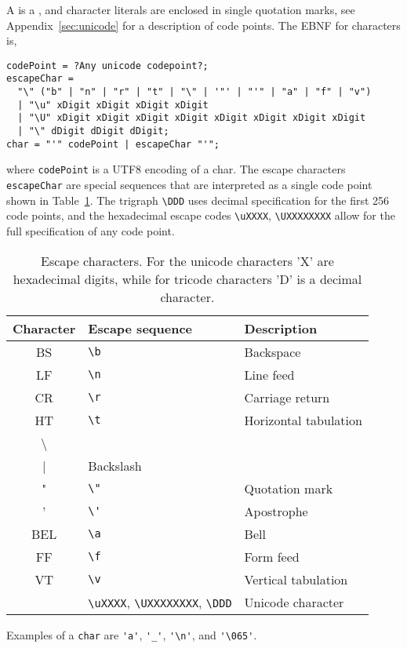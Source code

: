A  is a  , and character literals are enclosed in single quotation marks, see Appendix~\ref{sec:unicode} for a description of code points. The EBNF for characters is,
%
\begin{lstlisting}[language=ebnf]
codePoint = ?Any unicode codepoint?;
escapeChar = 
  "\" ("b" | "n" | "r" | "t" | "\" | '"' | "'" | "a" | "f" | "v")
  | "\u" xDigit xDigit xDigit xDigit
  | "\U" xDigit xDigit xDigit xDigit xDigit xDigit xDigit xDigit
  | "\" dDigit dDigit dDigit;
char = "'" codePoint | escapeChar "'";
\end{lstlisting}
% 
where \lstinline[language=ebnf]!codePoint! is a UTF8 encoding of a char. The escape characters \lstinline[language=ebnf]{escapeChar} are special sequences that are interpreted as a single code point shown in Table~\ref{tab:escapeChar}. The trigraph \lstinline|\DDD| uses decimal specification for the first 256 code points, and the hexadecimal escape codes \lstinline|\uXXXX|, \lstinline|\UXXXXXXXX| allow for the full specification of any code point.
\begin{table}
  \centering
  \begin{tabular}{|c|l|l|}
    \hline
    Character& Escape sequence & Description\\
    \hline
    BS &\lstinline|\b|& Backspace\\
    LF &\lstinline|\n|&Line feed\\
    CR &\lstinline|\r|&Carriage return\\
    HT &\lstinline|\t|&Horizontal tabulation\\
    \textbackslash &\lstinline|\\|&Backslash\\
     " &\lstinline|\"|&Quotation mark\\
    ' &\lstinline|\'|&Apostrophe\\
    BEL&\lstinline|\a|& Bell\\
    FF&\lstinline|\f|&Form feed\\
    VT &\lstinline|\v|&Vertical tabulation\\
    &\lstinline|\uXXXX|, \lstinline|\UXXXXXXXX|, \lstinline|\DDD|&Unicode character\\
    \hline
  \end{tabular}
  \caption{Escape characters. For the unicode characters 'X' are hexadecimal digits, while for tricode characters 'D' is a decimal character.}
  \label{tab:escapeChar}
\end{table}
Examples of a \lstinline[language=ebnf]!char! are \lstinline{'a'}, \lstinline{'_'}, \lstinline{'\n'}, and \lstinline{'\065'}.

